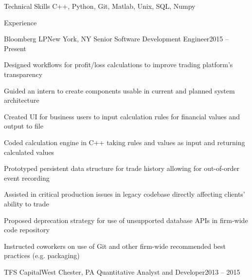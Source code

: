 \documentclass{resume}
\begin{document}

\begin{rSection}{Technical Skills}
C++, Python, Git, Matlab, Unix, SQL, Numpy
\end{rSection}


\begin{rSection}{Experience}


\begin{rSubsection}{Bloomberg LP}{New York, NY}
{Senior Software Development Engineer}{2015 -- Present}

\item Designed workflows for profit/loss calculations to improve
trading platform's transparency
\item Guided an intern to create components usable in current and
planned system architecture
\item Created UI for business users to input calculation rules
for financial values and output to file
\item Coded calculation engine in C++ taking rules and values as
input and returning calculated values
\item Prototyped persistent data structure for trade history
allowing for out-of-order event recording
\item Assisted in critical production issues in legacy codebase directly affecting clients' ability to trade
\item Proposed deprecation strategy for use of unsupported
database APIs in firm-wide code repository
\item Instructed coworkers on use of Git and other firm-wide
recommended best practices (e.g. packaging)

\end{rSubsection}

\begin{rSubsection}{TFS Capital}{West Chester, PA}
{Quantitative Analyst and Developer}{2013 -- 2015}


\end{rSubsection}
\end{rSection}
\end{document}
